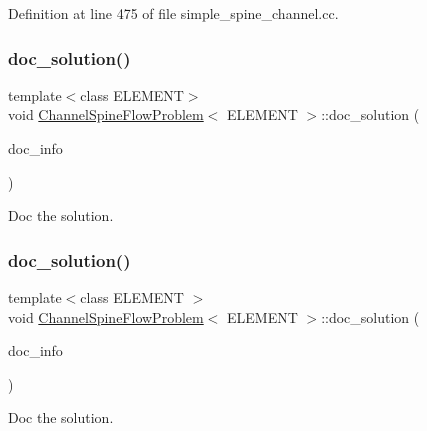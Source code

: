 Definition at line 475 of file simple\+\_\+spine\+\_\+channel.\+cc.

\mbox{\label{classChannelSpineFlowProblem_a101bdeee56502231945cbac272ca21f6}} 
\subsubsection{\texorpdfstring{doc\+\_\+solution()}{doc\_solution()}\hspace{0.1cm}{\footnotesize\ttfamily [1/2]}}
{\footnotesize\ttfamily template$<$class E\+L\+E\+M\+E\+NT$>$ \\
void \hyperlink{classChannelSpineFlowProblem}{Channel\+Spine\+Flow\+Problem}$<$ E\+L\+E\+M\+E\+NT $>$\+::doc\+\_\+solution (\begin{DoxyParamCaption}\item[{Doc\+Info \&}]{doc\+\_\+info }\end{DoxyParamCaption})}



Doc the solution. 

\mbox{\label{classChannelSpineFlowProblem_a101bdeee56502231945cbac272ca21f6}} 
\subsubsection{\texorpdfstring{doc\+\_\+solution()}{doc\_solution()}\hspace{0.1cm}{\footnotesize\ttfamily [2/2]}}
{\footnotesize\ttfamily template$<$class E\+L\+E\+M\+E\+NT $>$ \\
void \hyperlink{classChannelSpineFlowProblem}{Channel\+Spine\+Flow\+Problem}$<$ E\+L\+E\+M\+E\+NT $>$\+::doc\+\_\+solution (\begin{DoxyParamCaption}\item[{Doc\+Info \&}]{doc\+\_\+info }\end{DoxyParamCaption})}



Doc the solution. 



